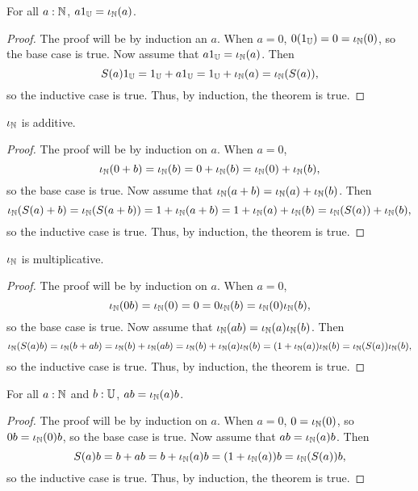 \documentclass[../../math.tex]{subfiles}
\begin{document}
\begin{theorem}
    For all $a : \mathbb{N}$, $a1_{\mathbb{U}} = \iota_{\mathbb{N}}(a)$.
\end{theorem}
\begin{proof}
    The proof will be by induction an $a$.  When $a = 0$, $0(1_{\mathbb{U}}) = 0 =
    \iota_{\mathbb{N}}(0)$, so the base case is true.  Now assume that $a1_{\mathbb{U}} = \iota_{\mathbb{N}}(a)$.  Then
    \[
        S(a)1_{\mathbb{U}} = 1_{\mathbb{U}} + a1_{\mathbb{U}} = 1_{\mathbb{U}} + \iota_{\mathbb{N}}(a) = \iota_{\mathbb{N}}(S(a)),
    \]
    so the inductive case is true.  Thus, by induction, the theorem is true.
\end{proof}

\begin{instance}
    $\iota_{\mathbb{N}}$ is additive.
\end{instance}
\begin{proof}
    The proof will be by induction on $a$.  When $a = 0$,
    \[
        \iota_{\mathbb{N}}(0 + b) = \iota_{\mathbb{N}}(b) = 0 + \iota_{\mathbb{N}}(b) = \iota_{\mathbb{N}}(0) + \iota_{\mathbb{N}}(b),
    \]
    so the base case is true.  Now assume that $\iota_{\mathbb{N}}(a + b) = \iota_{\mathbb{N}}(a) + \iota_{\mathbb{N}}(b)$.
    Then
    \[
        \iota_{\mathbb{N}}(S(a) + b) = \iota_{\mathbb{N}}(S(a + b)) = 1 + \iota_{\mathbb{N}}(a + b) = 1 + \iota_{\mathbb{N}}(a) + \iota_{\mathbb{N}}(b) =
        \iota_{\mathbb{N}}(S(a)) + \iota_{\mathbb{N}}(b),
    \]
    so the inductive case is true.  Thus, by induction, the theorem is true.
\end{proof}

\begin{instance}
    $\iota_{\mathbb{N}}$ is multiplicative.
\end{instance}
\begin{proof}
    The proof will be by induction on $a$.  When $a = 0$,
    \[
        \iota_{\mathbb{N}}(0b) = \iota_{\mathbb{N}}(0) = 0 = 0\iota_{\mathbb{N}}(b) = \iota_{\mathbb{N}}(0)\iota_{\mathbb{N}}(b),
    \]
    so the base case is true.  Now assume that $\iota_{\mathbb{N}}(ab) = \iota_{\mathbb{N}}(a)\iota_{\mathbb{N}}(b)$.
    Then
    \[
        \iota_{\mathbb{N}}(S(a)b) = \iota_{\mathbb{N}}(b + ab) = \iota_{\mathbb{N}}(b) + \iota_{\mathbb{N}}(ab) = \iota_{\mathbb{N}}(b) + \iota_{\mathbb{N}}(a)\iota_{\mathbb{N}}(b) =
        (1 + \iota_{\mathbb{N}}(a)) \iota_{\mathbb{N}}(b) = \iota_{\mathbb{N}}(S(a))\iota_{\mathbb{N}}(b),
    \]
    so the inductive case is true.  Thus, by induction, the theorem is true.
\end{proof}

\begin{theorem}
    For all $a : \mathbb{N}$ and $b : \mathbb{U}$, $ab = \iota_{\mathbb{N}}(a)b$.
\end{theorem}
\begin{proof}
    The proof will be by induction on $a$.  When $a = 0$, $0 = \iota_{\mathbb{N}}(0)$, so $0b =
    \iota_{\mathbb{N}}(0)b$, so the base case is true.  Now assume that $ab = \iota_{\mathbb{N}}(a)b$.  Then
    \[
        S(a)b = b + ab = b + \iota_{\mathbb{N}}(a)b = (1 + \iota_{\mathbb{N}}(a))b = \iota_{\mathbb{N}}(S(a))b,
    \]
    so the inductive case is true.  Thus, by induction, the theorem is true.
\end{proof}
\end{document}
